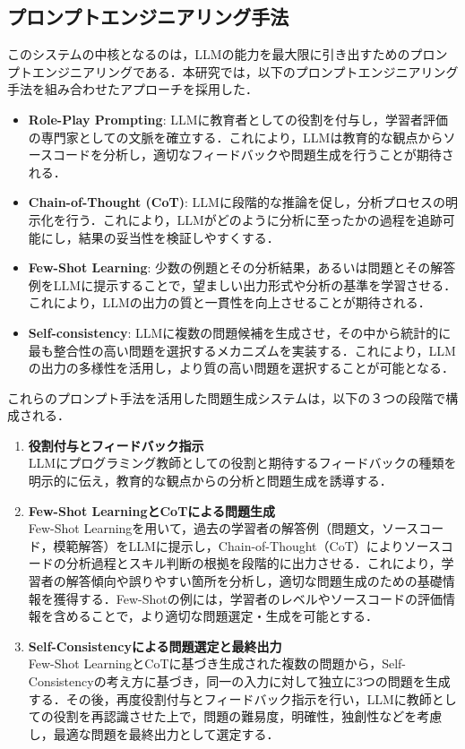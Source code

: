 \documentclass[twocolumn, fleqn, uplatex]{jsarticle}
\begin{document}
\subsection{プロンプトエンジニアリング手法}
このシステムの中核となるのは，LLMの能力を最大限に引き出すためのプロンプトエンジニアリングである．本研究では，以下のプロンプトエンジニアリング手法を組み合わせたアプローチを採用した．
\begin{itemize}
    \item \textbf{Role-Play Prompting}\cite{Role_play}: LLMに教育者としての役割を付与し，学習者評価の専門家としての文脈を確立する．これにより，LLMは教育的な観点からソースコードを分析し，適切なフィードバックや問題生成を行うことが期待される．
    \item \textbf{Chain-of-Thought (CoT)}\cite{CoT}: LLMに段階的な推論を促し，分析プロセスの明示化を行う．これにより，LLMがどのように分析に至ったかの過程を追跡可能にし，結果の妥当性を検証しやすくする．
    \item \textbf{Few-Shot Learning}\cite{Few-shot}: 少数の例題とその分析結果，あるいは問題とその解答例をLLMに提示することで，望ましい出力形式や分析の基準を学習させる．これにより，LLMの出力の質と一貫性を向上させることが期待される．
    \item \textbf{Self-consistency}\cite{Self-consitency}: LLMに複数の問題候補を生成させ，その中から統計的に最も整合性の高い問題を選択するメカニズムを実装する．これにより，LLMの出力の多様性を活用し，より質の高い問題を選択することが可能となる．
\end{itemize}
これらのプロンプト手法を活用した問題生成システムは，以下の３つの段階で構成される．
\begin{enumerate}
    \item \textbf{役割付与とフィードバック指示}\\
    LLMにプログラミング教師としての役割と期待するフィードバックの種類を明示的に伝え，教育的な観点からの分析と問題生成を誘導する．
    \item \textbf{Few-Shot LearningとCoTによる問題生成}\\
    Few-Shot Learningを用いて，過去の学習者の解答例（問題文，ソースコード，模範解答）をLLMに提示し，Chain-of-Thought（CoT）によりソースコードの分析過程とスキル判断の根拠を段階的に出力させる．これにより，学習者の解答傾向や誤りやすい箇所を分析し，適切な問題生成のための基礎情報を獲得する．Few-Shotの例には，学習者のレベルやソースコードの評価情報を含めることで，より適切な問題選定・生成を可能とする．
    \item \textbf{Self-Consistencyによる問題選定と最終出力}\\
    Few-Shot LearningとCoTに基づき生成された複数の問題から，Self-Consistencyの考え方に基づき，同一の入力に対して独立に3つの問題を生成する．その後，再度役割付与とフィードバック指示を行い，LLMに教師としての役割を再認識させた上で，問題の難易度，明確性，独創性などを考慮し，最適な問題を最終出力として選定する．
\end{enumerate}
\end{document}
